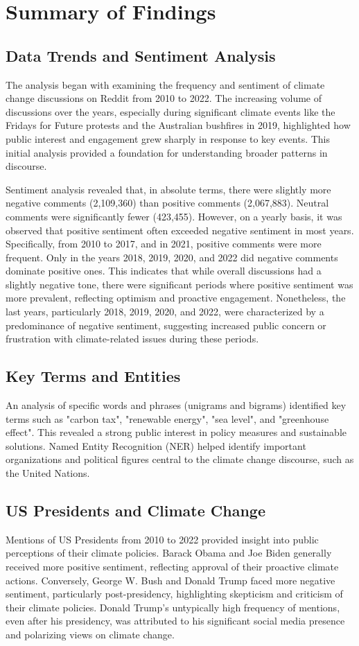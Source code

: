 \section{Summary of Findings}
\subsection{Data Trends and Sentiment Analysis}
The analysis began with examining the frequency and sentiment of climate change discussions on Reddit from 2010 to 2022. The increasing volume of discussions over the years, especially during significant climate events like the Fridays for Future protests and the Australian bushfires in 2019, highlighted how public interest and engagement grew sharply in response to key events. This initial analysis provided a foundation for understanding broader patterns in discourse.

Sentiment analysis revealed that, in absolute terms, there were slightly more negative comments (2,109,360) than positive comments (2,067,883). Neutral comments were significantly fewer (423,455). However, on a yearly basis, it was observed that positive sentiment often exceeded negative sentiment in most years. Specifically, from 2010 to 2017, and in 2021, positive comments were more frequent. Only in the years 2018, 2019, 2020, and 2022 did negative comments dominate positive ones. This indicates that while overall discussions had a slightly negative tone, there were significant periods where positive sentiment was more prevalent, reflecting optimism and proactive engagement. Nonetheless, the last years, particularly 2018, 2019, 2020, and 2022, were characterized by a predominance of negative sentiment, suggesting increased public concern or frustration with climate-related issues during these periods.

\subsection{Key Terms and Entities}
An analysis of specific words and phrases (unigrams and bigrams) identified key terms such as "carbon tax", "renewable energy", "sea level", and "greenhouse effect". This revealed a strong public interest in policy measures and sustainable solutions. Named Entity Recognition (NER) helped identify important organizations and political figures central to the climate change discourse, such as the United Nations.

\subsection{US Presidents and Climate Change}
Mentions of US Presidents from 2010 to 2022 provided insight into public perceptions of their climate policies. Barack Obama and Joe Biden generally received more positive sentiment, reflecting approval of their proactive climate actions. Conversely, George W. Bush and Donald Trump faced more negative sentiment, particularly post-presidency, highlighting skepticism and criticism of their climate policies. Donald Trump's untypically high frequency of mentions, even after his presidency, was attributed to his significant social media presence and polarizing views on climate change.


